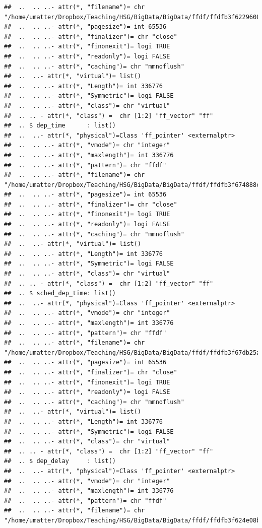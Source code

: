 \documentclass[
  12pt,
]{style/krantz}
\begin{document}
\begin{verbatim}
##  ..  .. ..- attr(*, "filename")= chr "/home/umatter/Dropbox/Teaching/HSG/BigData/BigData/ffdf/ffdfb3f62296082d.ff"
##  ..  .. ..- attr(*, "pagesize")= int 65536
##  ..  .. ..- attr(*, "finalizer")= chr "close"
##  ..  .. ..- attr(*, "finonexit")= logi TRUE
##  ..  .. ..- attr(*, "readonly")= logi FALSE
##  ..  .. ..- attr(*, "caching")= chr "mmnoflush"
##  ..  ..- attr(*, "virtual")= list()
##  ..  .. ..- attr(*, "Length")= int 336776
##  ..  .. ..- attr(*, "Symmetric")= logi FALSE
##  ..  .. ..- attr(*, "class")= chr "virtual"
##  .. .. - attr(*, "class") =  chr [1:2] "ff_vector" "ff"
##  .. $ dep_time      : list()
##  ..  ..- attr(*, "physical")=Class 'ff_pointer' <externalptr> 
##  ..  .. ..- attr(*, "vmode")= chr "integer"
##  ..  .. ..- attr(*, "maxlength")= int 336776
##  ..  .. ..- attr(*, "pattern")= chr "ffdf"
##  ..  .. ..- attr(*, "filename")= chr "/home/umatter/Dropbox/Teaching/HSG/BigData/BigData/ffdf/ffdfb3f674888c10.ff"
##  ..  .. ..- attr(*, "pagesize")= int 65536
##  ..  .. ..- attr(*, "finalizer")= chr "close"
##  ..  .. ..- attr(*, "finonexit")= logi TRUE
##  ..  .. ..- attr(*, "readonly")= logi FALSE
##  ..  .. ..- attr(*, "caching")= chr "mmnoflush"
##  ..  ..- attr(*, "virtual")= list()
##  ..  .. ..- attr(*, "Length")= int 336776
##  ..  .. ..- attr(*, "Symmetric")= logi FALSE
##  ..  .. ..- attr(*, "class")= chr "virtual"
##  .. .. - attr(*, "class") =  chr [1:2] "ff_vector" "ff"
##  .. $ sched_dep_time: list()
##  ..  ..- attr(*, "physical")=Class 'ff_pointer' <externalptr> 
##  ..  .. ..- attr(*, "vmode")= chr "integer"
##  ..  .. ..- attr(*, "maxlength")= int 336776
##  ..  .. ..- attr(*, "pattern")= chr "ffdf"
##  ..  .. ..- attr(*, "filename")= chr "/home/umatter/Dropbox/Teaching/HSG/BigData/BigData/ffdf/ffdfb3f67db25a8e.ff"
##  ..  .. ..- attr(*, "pagesize")= int 65536
##  ..  .. ..- attr(*, "finalizer")= chr "close"
##  ..  .. ..- attr(*, "finonexit")= logi TRUE
##  ..  .. ..- attr(*, "readonly")= logi FALSE
##  ..  .. ..- attr(*, "caching")= chr "mmnoflush"
##  ..  ..- attr(*, "virtual")= list()
##  ..  .. ..- attr(*, "Length")= int 336776
##  ..  .. ..- attr(*, "Symmetric")= logi FALSE
##  ..  .. ..- attr(*, "class")= chr "virtual"
##  .. .. - attr(*, "class") =  chr [1:2] "ff_vector" "ff"
##  .. $ dep_delay     : list()
##  ..  ..- attr(*, "physical")=Class 'ff_pointer' <externalptr> 
##  ..  .. ..- attr(*, "vmode")= chr "integer"
##  ..  .. ..- attr(*, "maxlength")= int 336776
##  ..  .. ..- attr(*, "pattern")= chr "ffdf"
##  ..  .. ..- attr(*, "filename")= chr "/home/umatter/Dropbox/Teaching/HSG/BigData/BigData/ffdf/ffdfb3f624e08b.ff"

\end{verbatim}
\end{document}
